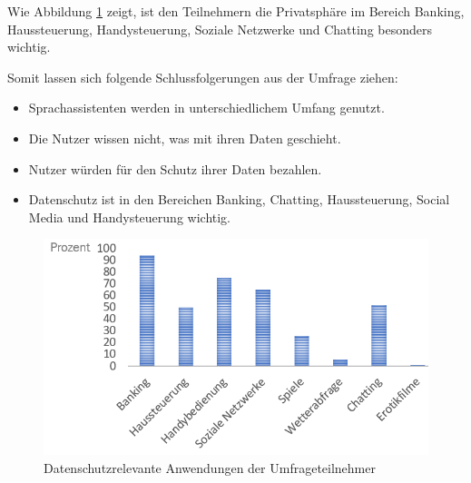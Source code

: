 Wie Abbildung \ref{fig:umfrage_anwendung} zeigt, ist den Teilnehmern die Privatsphäre im Bereich Banking, Haussteuerung, Handysteuerung, Soziale Netzwerke und Chatting besonders wichtig.

Somit lassen sich folgende Schlussfolgerungen aus der Umfrage ziehen:
\begin{itemize}	
	\item Sprachassistenten werden in unterschiedlichem Umfang genutzt.
	\item Die Nutzer wissen nicht, was mit ihren Daten geschieht.
	\item Nutzer würden für den Schutz ihrer Daten bezahlen.
	\item Datenschutz ist in den Bereichen Banking, Chatting, Haussteuerung, Social Media und Handysteuerung wichtig.
\end{itemize}

\begin{figure}[!ht]
	\centering
	\includegraphics[width=0.9\linewidth]{Picture/umfrage_anwendung}
	\caption[Datenschutzrelevante Anwendungen der Umfrageteilnehmers]{Datenschutzrelevante Anwendungen der Umfrageteilnehmer}
	\label{fig:umfrage_anwendung}
\end{figure}
